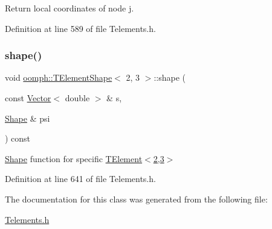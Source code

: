 Return local coordinates of node j. 



Definition at line 589 of file Telements.\+h.

\mbox{\label{classoomph_1_1TElementShape_3_012_00_013_01_4_a896f737a87fc608d78fc050f5e73d668}} 
\subsubsection{\texorpdfstring{shape()}{shape()}}
{\footnotesize\ttfamily void \hyperlink{classoomph_1_1TElementShape}{oomph\+::\+T\+Element\+Shape}$<$ 2, 3 $>$\+::shape (\begin{DoxyParamCaption}\item[{const \hyperlink{classoomph_1_1Vector}{Vector}$<$ double $>$ \&}]{s,  }\item[{\hyperlink{classoomph_1_1Shape}{Shape} \&}]{psi }\end{DoxyParamCaption}) const\hspace{0.3cm}{\ttfamily [inline]}}



\hyperlink{classoomph_1_1Shape}{Shape} function for specific \hyperlink{classoomph_1_1TElement}{T\+Element$<$2,3$>$} 



Definition at line 641 of file Telements.\+h.



The documentation for this class was generated from the following file\+:\begin{DoxyCompactItemize}
\item 
\hyperlink{Telements_8h}{Telements.\+h}\end{DoxyCompactItemize}
